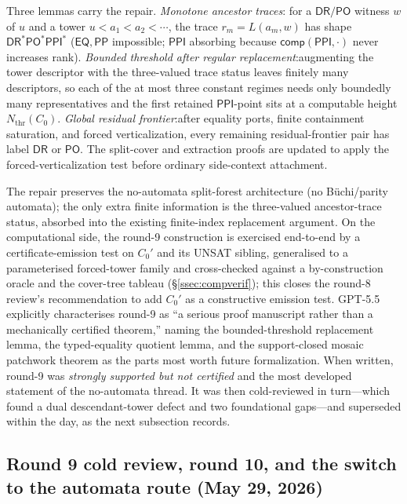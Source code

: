 \documentclass[
]{ceurart}
\theoremstyle{definition}
\newcommand{\DR}{\ensuremath{\mathsf{DR}}}
\newcommand{\PO}{\ensuremath{\mathsf{PO}}}
\newcommand{\EQ}{\ensuremath{\mathsf{EQ}}}
\newcommand{\PP}{\ensuremath{\mathsf{PP}}}
\newcommand{\PPI}{\ensuremath{\mathsf{PPI}}}
\newcommand{\comp}{\ensuremath{\mathsf{comp}}}
\begin{document}
Three lemmas carry the repair.  \emph{Monotone ancestor traces}:\@
for a $\DR/\PO$ witness $w$ of $u$ and a tower $u<a_1<a_2<\cdots$,
the trace $r_m=L(a_m,w)$ has shape $\DR^*\PO^*\PPI^*$ ($\EQ,\PP$
impossible; $\PPI$ absorbing because $\comp(\PPI,\cdot)$ never
increases rank).  \emph{Bounded threshold after regular
replacement}:\@ augmenting the tower descriptor with the
three-valued trace status leaves finitely many descriptors, so each
of the at most three constant regimes needs only boundedly many
representatives and the first retained $\PPI$-point sits at a
computable height $N_{\mathrm{thr}}(C_0)$.  \emph{Global residual
frontier}:\@ after equality ports, finite containment saturation,
and forced verticalization, every remaining residual-frontier pair
has label $\DR$ or $\PO$.  The split-cover and extraction proofs are
updated to apply the forced-verticalization test before ordinary
side-context attachment.

The repair preserves the no-automata split-forest architecture (no
B\"uchi/parity automata); the only extra finite information is the
three-valued ancestor-trace status, absorbed into the existing
finite-index replacement argument.  On the computational side, the
round-9 construction is exercised end-to-end by a certificate-emission
test on $C_0'$ and its UNSAT sibling, generalised to a parameterised
forced-tower family and cross-checked against a by-construction oracle
and the cover-tree tableau (\S\ref{ssec:compverif}); this closes the
round-8 review's recommendation to add $C_0'$ as a constructive
emission test.  GPT-5.5 explicitly characterises
round-9 as ``a serious proof manuscript rather than a mechanically
certified theorem,'' naming the bounded-threshold replacement lemma,
the typed-equality quotient lemma, and the support-closed mosaic
patchwork theorem as the parts most worth future formalization.
When written, round-9 was \emph{strongly supported but not
certified} and the most developed statement of the no-automata thread.
It was then cold-reviewed in turn---which found a dual descendant-tower
defect and two foundational gaps---and superseded within the day, as
the next subsection records.

\subsection{Round 9 cold review, round 10, and the switch to the
automata route (May 29, 2026)}
\label{ssec:round10-automata}
\end{document}

